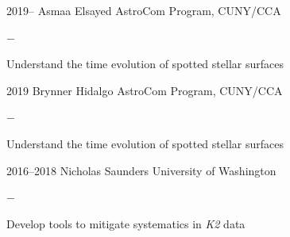\documentclass[]{luger-cv} %
\begin{document}
\begin{entrylist}
        \entry
        {2019--}
        {Asmaa Elsayed}
        {AstroCom Program, CUNY/CCA}
        {%
            \vspace{-1em}
            \begin{list}{{\color{numcolor}$-$}}{\cvlist}
                \item Understand the time evolution of spotted stellar surfaces
            \end{list}
        }

        \entry
        {2019}
        {Brynner Hidalgo}
        {AstroCom Program, CUNY/CCA}
        {%
            \vspace{-1em}
            \begin{list}{{\color{numcolor}$-$}}{\cvlist}
                \item Understand the time evolution of spotted stellar surfaces
            \end{list}
        }

        \entry
        {2016--2018}
        {Nicholas Saunders}
        {University of Washington}
        {%
            \vspace{-1em}
            \begin{list}{{\color{numcolor}$-$}}{\cvlist}
                \item Develop tools to mitigate systematics in \emph{K2} data
            \end{list}
        }


    \end{entrylist}
\fi

\clearpage


\ifdefined \withother
\end{document}
